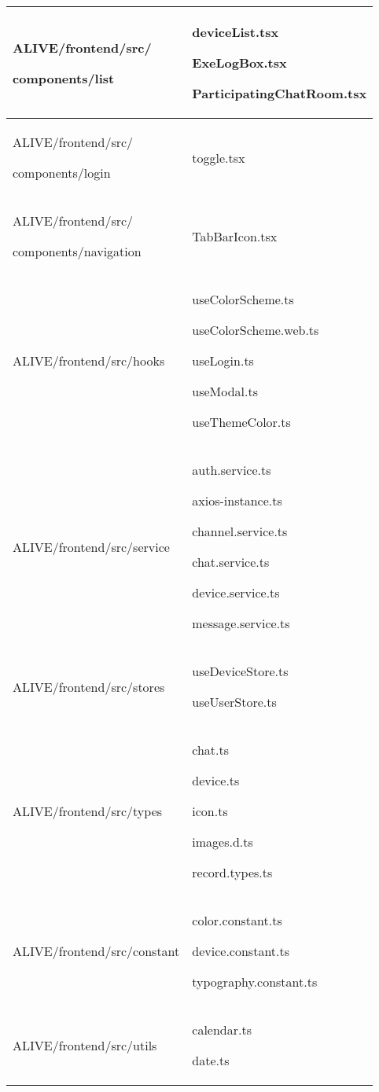 \documentclass[conference]{IEEEtran}
\begin{document}
\begin{table}[h]
\begin{tabular}{|p{3.7cm}|p{4.1cm}|}
          ALIVE/frontend/src/ \par components/list \par  & deviceList.tsx \par ExeLogBox.tsx \par ParticipatingChatRoom.tsx
          \\ \hline
          
          ALIVE/frontend/src/ \par components/login  & toggle.tsx
          \\ \hline
          
          ALIVE/frontend/src/ \par components/navigation  & TabBarIcon.tsx
          \\ \hline
          
          ALIVE/frontend/src/hooks \par  & useColorScheme.ts \par useColorScheme.web.ts \par useLogin.ts \par useModal.ts \par useThemeColor.ts
          \\ \hline
          
          ALIVE/frontend/src/service \par  & auth.service.ts \par axios-instance.ts \par channel.service.ts \par chat.service.ts \par device.service.ts \par message.service.ts
          \\ \hline
          
          ALIVE/frontend/src/stores \par  &   useDeviceStore.ts \par useUserStore.ts
          \\ \hline
          
          ALIVE/frontend/src/types \par  & chat.ts \par device.ts \par icon.ts \par images.d.ts \par record.types.ts 
          \\ \hline
          
          ALIVE/frontend/src/constant \par  & color.constant.ts \par device.constant.ts \par typography.constant.ts
          \\ \hline
          
          ALIVE/frontend/src/utils \par  & calendar.ts \par date.ts
          \\ \hline
          
    \end{tabular}
\end{table}
\end{document}
